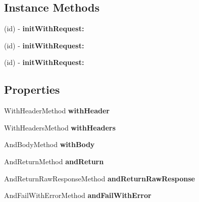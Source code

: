 \subsection*{Instance Methods}
\begin{DoxyCompactItemize}
\item 
\hypertarget{interface_l_s_stub_request_d_s_l_a9e9bb566b7731a5b0f7df294ab27f655}{(id) -\/ {\bfseries init\-With\-Request\-:}}\label{interface_l_s_stub_request_d_s_l_a9e9bb566b7731a5b0f7df294ab27f655}

\item 
\hypertarget{interface_l_s_stub_request_d_s_l_a9e9bb566b7731a5b0f7df294ab27f655}{(id) -\/ {\bfseries init\-With\-Request\-:}}\label{interface_l_s_stub_request_d_s_l_a9e9bb566b7731a5b0f7df294ab27f655}

\item 
\hypertarget{interface_l_s_stub_request_d_s_l_a9e9bb566b7731a5b0f7df294ab27f655}{(id) -\/ {\bfseries init\-With\-Request\-:}}\label{interface_l_s_stub_request_d_s_l_a9e9bb566b7731a5b0f7df294ab27f655}

\end{DoxyCompactItemize}
\subsection*{Properties}
\begin{DoxyCompactItemize}
\item 
\hypertarget{interface_l_s_stub_request_d_s_l_a6adf72fed3fbd9ce946a4690d1767382}{With\-Header\-Method {\bfseries with\-Header}}\label{interface_l_s_stub_request_d_s_l_a6adf72fed3fbd9ce946a4690d1767382}

\item 
\hypertarget{interface_l_s_stub_request_d_s_l_a7c8493aec75438c8d5805689c003750b}{With\-Headers\-Method {\bfseries with\-Headers}}\label{interface_l_s_stub_request_d_s_l_a7c8493aec75438c8d5805689c003750b}

\item 
\hypertarget{interface_l_s_stub_request_d_s_l_a0039dc6d8fa7ab22431a0f8fdb92ce13}{And\-Body\-Method {\bfseries with\-Body}}\label{interface_l_s_stub_request_d_s_l_a0039dc6d8fa7ab22431a0f8fdb92ce13}

\item 
\hypertarget{interface_l_s_stub_request_d_s_l_ac89b68f769cd6652e073a8a7112a9446}{And\-Return\-Method {\bfseries and\-Return}}\label{interface_l_s_stub_request_d_s_l_ac89b68f769cd6652e073a8a7112a9446}

\item 
\hypertarget{interface_l_s_stub_request_d_s_l_a72c94e571f65f72184e1daf2be332739}{And\-Return\-Raw\-Response\-Method {\bfseries and\-Return\-Raw\-Response}}\label{interface_l_s_stub_request_d_s_l_a72c94e571f65f72184e1daf2be332739}

\item 
\hypertarget{interface_l_s_stub_request_d_s_l_ac687e13c08e1f66cedca0955d971f1cd}{And\-Fail\-With\-Error\-Method {\bfseries and\-Fail\-With\-Error}}\label{interface_l_s_stub_request_d_s_l_ac687e13c08e1f66cedca0955d971f1cd}

\end{DoxyCompactItemize}


